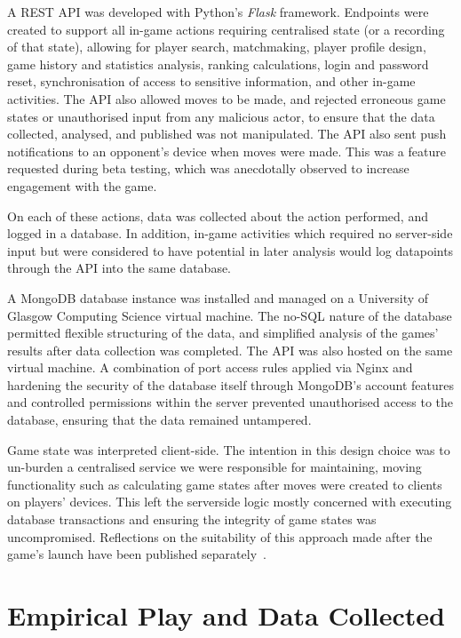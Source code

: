 A REST API was developed with Python's \emph{Flask} framework. Endpoints were
created to support all in-game actions requiring centralised state (or a
recording of that state), allowing for player search, matchmaking, player
profile design, game history and statistics analysis, ranking calculations,
login and password reset, synchronisation of access to sensitive information,
and other in-game activities. The API also allowed moves to be made, and
rejected erroneous game states or unauthorised input from any malicious actor,
to ensure that the data collected, analysed, and published was not manipulated.
The API also sent push notifications to an opponent's device when moves were
made. This was a feature requested during beta testing, which was anecdotally
observed to increase engagement with the game.

On each of these actions, data was collected about the action performed, and
logged in a database. In addition, in-game activities which required no
server-side input but were considered to have potential in later analysis would
log datapoints through the API into the same database.

A MongoDB database instance was installed and managed on a University of Glasgow
Computing Science virtual machine. The no-SQL nature of the database permitted
flexible structuring of the data, and simplified analysis of the games' results
after data collection was completed. The API was also hosted on the same virtual
machine. A combination of port access rules applied via Nginx and hardening the
security of the database itself through MongoDB's account features and
controlled permissions within the server prevented unauthorised access to the
database, ensuring that the data remained untampered.

Game state was interpreted client-side. The intention in this design choice was
to un-burden a centralised service we were responsible for maintaining, moving
functionality such as calculating game states after moves were created to
clients on players' devices. This left the serverside logic mostly concerned
with executing database transactions and ensuring the integrity of game states
was uncompromised. Reflections on the suitability of this approach made after
the game's launch have been published separately~\cite{GameOn2020}.


\section{Empirical Play and Data Collected}\label{sec:rpglite_data_discussed}


